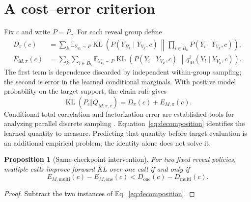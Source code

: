 \documentclass{article}
\newtheorem{proposition}{Proposition}
\newcommand{\KL}{\operatorname{KL}}
\newcommand{\E}{\mathbb E}
\begin{document}
\section{A cost--error criterion}
Fix $c$ and write $P=P_c$. For each reveal group define
\begin{align}
 D_\pi(c)&=\sum_k\E_{Y_{V_k}\sim P}
 \KL\!\left(P(Y_{B_k}\mid Y_{V_k},c)\,\middle\Vert\,
       \prod_{i\in B_k}P(Y_i\mid Y_{V_k},c)\right),\\
 E_{M,\pi}(c)&=\sum_k\sum_{i\in B_k}\E_{Y_{V_k}\sim P}
 \KL\!\left(P(Y_i\mid Y_{V_k},c)\,\middle\Vert\,
       q_M^i(Y_i\mid Y_{V_k},c)\right).
\end{align}
The first term is dependence discarded by independent within-group sampling;
the second is error in the learned conditional marginals. With positive model
probability on the target support, the chain rule gives
\begin{equation}
 \KL(P_c\Vert Q_{M,\pi,c})=D_\pi(c)+E_{M,\pi}(c).
 \label{eq:decomposition}
\end{equation}
Conditional total correlation and factorization error are established tools
for analyzing parallel discrete sampling
\citep{factorization2025,ctcdepth2026,intrinsicdependence2026}.
Equation~\eqref{eq:decomposition} identifies the learned quantity to measure.
Predicting that quantity before target evaluation is an additional empirical
problem; the identity alone does not solve it.

\begin{proposition}[Same-checkpoint intervention]
For two fixed reveal policies, multiple calls improve forward KL over one call
if and only if
\begin{equation}
 E_{M,\mathrm{multi}}(c)-E_{M,\mathrm{one}}(c)
 <D_{\mathrm{one}}(c)-D_{\mathrm{multi}}(c).
 \label{eq:intervention}
\end{equation}
\end{proposition}
\begin{proof}
Subtract the two instances of Eq.~\eqref{eq:decomposition}.
\end{proof}
\end{document}

